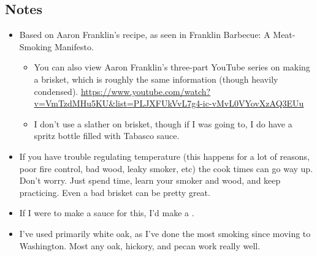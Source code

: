 \begin{multicols}{2}
\begin{enumerate}
\end{enumerate}

\subsection*{Notes}
\begin{itemize}
    \item Based on Aaron Franklin's recipe, as seen in Franklin Barbecue: A Meat-Smoking Manifesto.
    \begin{itemize}
        \item You can also view Aaron Franklin's three-part YouTube series on making a brisket, which is roughly the same information (though heavily condensed). \url{https://www.youtube.com/watch?v=VmTzdMHu5KU&list=PLJXFUkVvL7g4-ic-vMvL0VYovXzAQ3EUu}
        \item I don't use a slather on brisket, though if I was going to, I do have a spritz bottle filled with Tabasco sauce.
    \end{itemize}
    \item If you have trouble regulating temperature (this happens for a lot of reasons, poor fire control, bad wood, leaky smoker, etc) the cook times can go way up. Don't worry. Just spend time, learn your smoker and wood, and keep practicing. Even a bad brisket can be pretty great.
    \item If I were to make a sauce for this, I'd make a .
    \item I've used primarily white oak, as I've done the most smoking since moving to Washington. Most any oak, hickory, and pecan work really well.
\end{itemize}
\end{multicols}
\clearpage